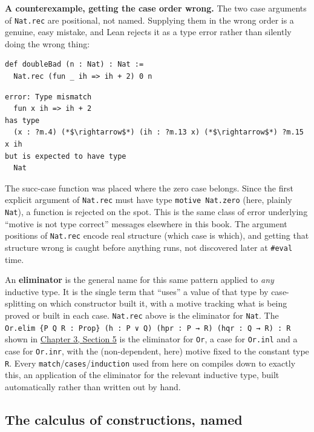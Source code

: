 \textbf{A counterexample, getting the case order wrong.} The two case arguments of \texttt{Nat.rec} are positional, not named. Supplying them in the wrong order is a genuine, easy mistake, and Lean rejects it as a type error rather than silently doing the wrong thing:

\begin{lstlisting}
def doubleBad (n : Nat) : Nat :=
  Nat.rec (fun _ ih => ih + 2) 0 n
\end{lstlisting}

\begin{lstlisting}
error: Type mismatch
  fun x ih => ih + 2
has type
  (x : ?m.4) (*$\rightarrow$*) (ih : ?m.13 x) (*$\rightarrow$*) ?m.15 x ih
but is expected to have type
  Nat
\end{lstlisting}

The succ-case function was placed where the zero case belongs. Since the first explicit argument of \texttt{Nat.rec} must have type \texttt{motive Nat.zero} (here, plainly \texttt{Nat}), a function is rejected on the spot. This is the same class of error underlying ``motive is not type correct'' messages elsewhere in this book. The argument positions of \texttt{Nat.rec} encode real structure (which case is which), and getting that structure wrong is caught before anything runs, not discovered later at \texttt{\#eval} time.

An \textbf{eliminator} is the general name for this same pattern applied to \emph{any} inductive type. It is the single term that ``uses'' a value of that type by case-splitting on which constructor built it, with a motive tracking what is being proved or built in each case. \texttt{Nat.rec} above is the eliminator for \texttt{Nat}. The \texttt{Or.elim \{P Q R : Prop\} (h : P ∨ Q) (hpr : P → R) (hqr : Q → R) : R} shown in \hyperref[sec:03-propositions-and-proofs:05-and-or-not:1]{Chapter 3, Section 5} is the eliminator for \texttt{Or}, a case for \texttt{Or.inl} and a case for \texttt{Or.inr}, with the (non-dependent, here) motive fixed to the constant type \texttt{R}. Every \texttt{match}/\texttt{cases}/\texttt{induction} used from here on compiles down to exactly this, an application of the eliminator for the relevant inductive type, built automatically rather than written out by hand.

\subsection{The calculus of constructions, named}\label{sec:01-basics:05-pi-sigma-and-coc:7}

